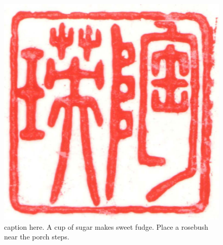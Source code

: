 \documentclass[
  letterpaper,
  DIV=11,
  numbers=noendperiod]{scrartcl}
\begin{document}
\begin{figure}
  \centering
  \includegraphics[width=0.7\linewidth]{stamp1a.jpg}
  \caption{\label{fig-wrap2}caption here. A cup of sugar makes sweet fudge. Place a rosebush near the porch steps.}
  \vspace{-3pt}
\end{figure}
\end{document}
